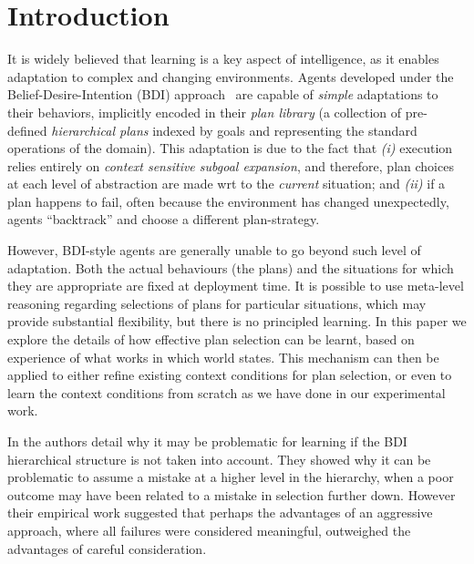 \section{Introduction}\label{sec:intro}



It is widely believed that learning is a key aspect of intelligence, as
it enables adaptation to complex and changing environments.  
%
Agents developed under the Belief-Desire-Intention (BDI)
approach~\cite{Bratman88} are capable of \textit{simple} adaptations to their
behaviors, implicitly encoded in their \textit{plan library} (a collection of
pre-defined \textit{hierarchical plans} indexed by goals and representing the
standard operations of the domain).
%
This adaptation is due to the fact that \textit{(i)} execution relies entirely
on \textit{context sensitive subgoal expansion}, and therefore, plan choices at
each level of abstraction  are made wrt to the \textit{current}
situation; and  \textit{(ii)} if a plan happens to fail, often because the
environment has changed unexpectedly, agents ``backtrack'' and choose a
different plan-strategy.

However, BDI-style agents are generally unable to go beyond such level of
adaptation. Both the actual behaviours (the plans) and the situations
for which they are appropriate are fixed at deployment time. It is
possible to use meta-level reasoning regarding selections of plans for
particular situations, which may provide substantial flexibility, but
there is no principled learning. In this paper we explore the details
of how effective plan selection can be learnt, based on experience of
what works in which world states.  This mechanism can then be applied
to either refine existing context conditions for plan selection, or
even to learn the context conditions from scratch as we have done in
our experimental work.


In \cite{APSS08} the authors detail why it may be problematic for
learning if the BDI hierarchical structure is not taken into account.
They showed why it can be problematic to assume a mistake at a
higher level in the hierarchy, when a poor outcome may have been
related to a mistake in selection further down.  However their
empirical work suggested that perhaps the advantages of an aggressive
approach, where all failures were considered meaningful, outweighed
the advantages of careful consideration.

